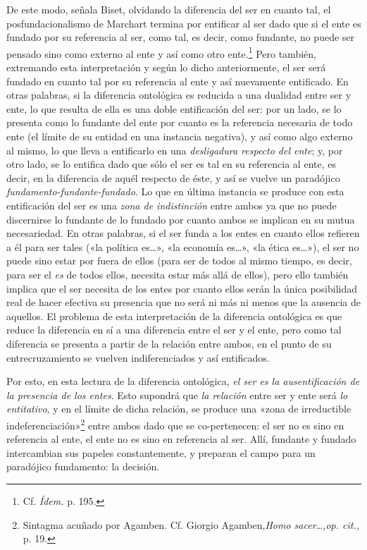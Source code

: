 De este modo, señala Biset, olvidando la diferencia del ser en cuanto tal, el posfundacionalismo de Marchart termina por entificar al ser dado que si el ente es fundado por su referencia al ser, como tal, es decir, como fundante, no puede ser pensado sino como externo al ente y así como otro ente.\footnote{Cf. \emph{Ídem.} p. 195.} Pero también, extremando esta interpretación y según lo dicho anteriormente, el ser será fundado en cuanto tal por su referencia al ente y así nuevamente entificado. En otras palabras, si la diferencia ontológica es reducida a una dualidad entre ser y ente, lo que resulta de ella es una doble entificación del ser: por un lado, se lo presenta como lo fundante del ente por cuanto es la referencia necesaria de todo ente (el límite de su entidad en una instancia negativa), y así como algo externo al mismo, lo que lleva a entificarlo en una \emph{desligadura respecto del ente}; y, por otro lado, se lo entifica dado que sólo el ser es tal en su referencia al ente, es decir, en la diferencia de aquél respecto de éste, y así se vuelve un paradójico \emph{fundamento-fundante-fundado}. Lo que en última instancia se produce con esta entificación del ser es una \emph{zona de indistinción} entre ambos ya que no puede discernirse lo fundante de lo fundado por cuanto ambos se implican en su mutua necesariedad. En otras palabras, si el ser funda a los entes en cuanto ellos refieren a él para ser tales («la política es\ldots», «la economía es\ldots», «la ética es\ldots»), el ser no puede sino estar por fuera de ellos (para ser de todos al mismo tiempo, es decir, para ser el \emph{es} de todos ellos, necesita estar más allá de ellos), pero ello también implica que el ser necesita de los entes por cuanto ellos serán la única posibilidad real de hacer efectiva su presencia que no será ni más ni menos que la ausencia de aquellos. El problema de esta interpretación de la diferencia ontológica es que reduce la diferencia en sí a una diferencia entre el ser y el ente, pero como tal diferencia se presenta a partir de la relación entre ambos, en el punto de su entrecruzamiento se vuelven indiferenciados y así entificados.

Por esto, en esta lectura de la diferencia ontológica, \emph{el ser es la ausentificación de la presencia de los entes}. Esto supondrá que \emph{la relación} entre ser y ente será \emph{lo entitativo}, y en el límite de dicha relación, se produce una «zona de irreductible indeferenciación»\footnote{Sintagma acuñado por Agamben. Cf. Giorgio Agamben,\emph{Homo sacer\ldots,op. cit.,} p. 19.} entre ambos dado que se co-pertenecen: el ser no es sino en referencia al ente, el ente no es sino en referencia al ser. Allí, fundante y fundado intercambian sus papeles constantemente, y preparan el campo para un paradójico fundamento: la decisión.

